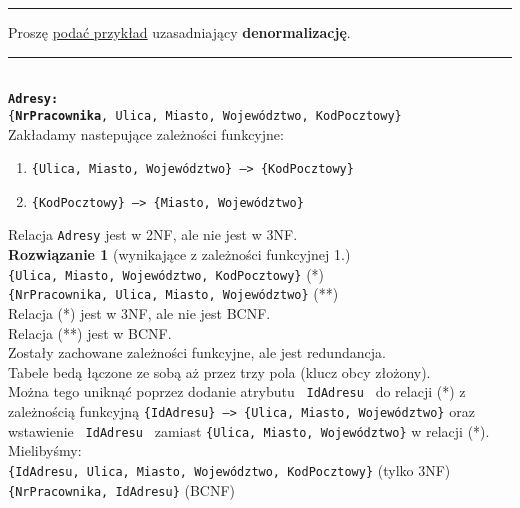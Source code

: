 \documentclass[a5paper,6pt]{article}
\newcommand{\horrule}[1]{\rule{\linewidth}{#1}}
\begin{document}
\pagebreak

    \horrule{0.5pt}
    Proszę \underline{podać przykład} uzasadniający \textbf{denormalizację}.\\
    \horrule{0.5pt}\\

    \texttt{\textbf{Adresy:}\\
    \{\textbf{{\color{green}\faKey}NrPracownika}, Ulica, Miasto,
    Województwo, KodPocztowy\}}\\

    Zakładamy nastepujące zależności funkcyjne:
    \begin{enumerate}
        \item \texttt{\{Ulica, Miasto, Województwo\} --> \{KodPocztowy\}}
        \item \texttt{\{KodPocztowy\} --> \{Miasto, Województwo\}}
    \end{enumerate}

    Relacja \texttt{Adresy} jest w 2NF, ale nie jest w 3NF.\\

    \textbf{Rozwiązanie 1} (wynikające z zależności funkcyjnej 1.)\\

    \texttt{\{{\color{green}\faKey}{\color{blue}\faKey}Ulica,
    {\color{green}\faKey}Miasto, {\color{green}\faKey}Województwo,
    {\color{blue}\faKey}KodPocztowy\}} (*)\\
    \texttt{\{{\color{green}\faKey}NrPracownika, Ulica, Miasto, Województwo\}}
    (**)\\

    Relacja (*) jest w 3NF, ale nie jest BCNF.\\
    Relacja (**) jest w BCNF.\\

    Zostały zachowane zależności funkcyjne, ale jest redundancja.\\
    Tabele bedą łączone ze sobą aż przez trzy pola (klucz obcy złożony).\\
    Można tego uniknąć poprzez dodanie atrybutu \texttt{ IdAdresu } do
    relacji (*) z zależnością funkcyjną \texttt{\{IdAdresu\} --> \{Ulica,
    Miasto, Województwo\}} oraz wstawienie \texttt{ IdAdresu } zamiast
    \texttt{\{Ulica, Miasto, Województwo\}} w relacji (*). Mielibyśmy:\\

    \texttt{\{{\color{red}\faKey}IdAdresu,
    {\color{green}\faKey}{\color{blue}\faKey}Ulica,
    {\color{green}\faKey}Miasto, {\color{green}\faKey}Województwo,
    {\color{green}\faKey}KodPocztowy\}}
    (tylko 3NF)\\
    \texttt{\{{\color{green}\faKey}NrPracownika, IdAdresu\}} (BCNF)\\
\end{document}
